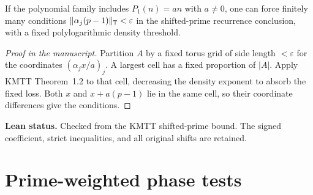 \begin{corollary}\label{c:bohr}
\leanok
If the polynomial family includes $P_1(n)=an$ with $a\ne0$,
one can force finitely many conditions
$\lVert\alpha_j(p-1)\rVert_{\mathbb T}<\varepsilon$ in the shifted-prime recurrence
conclusion, with a fixed polylogarithmic density threshold.
\end{corollary}
\begin{proof}[Proof in the manuscript]
\leanok
Partition $A$ by a fixed torus grid of side length
$<\varepsilon$ for the coordinates $(\alpha_jx/a)_j$.
A largest cell has a fixed proportion of $|A|$. Apply KMTT
Theorem~1.2 to that cell, decreasing the density exponent to
absorb the fixed loss. Both $x$ and $x+a(p-1)$ lie in the same
cell, so their coordinate differences give the conditions.
\end{proof}
\noindent\textbf{Lean status.} Checked from the KMTT
shifted-prime bound. The signed coefficient, strict inequalities, and all original shifts
are retained.

\section{Prime-weighted phase tests}

